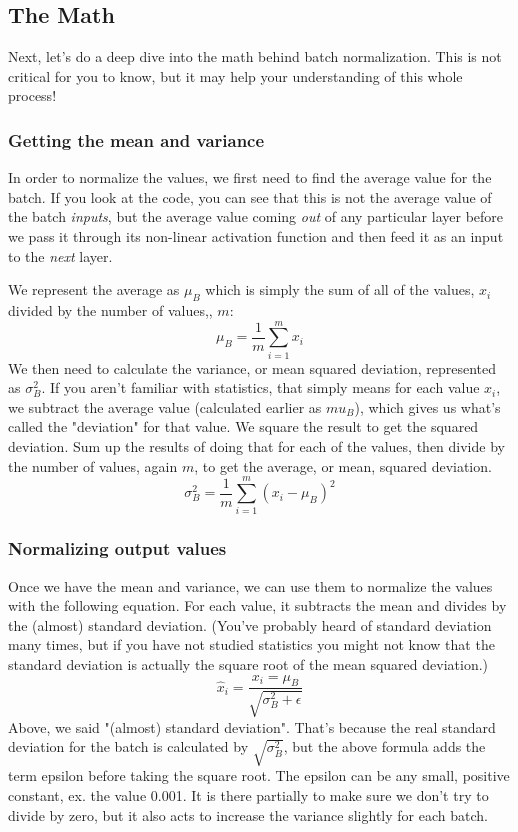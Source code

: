 \subsection{The Math}
Next, let's do a deep dive into the math behind batch normalization. This is not critical for you to know, but it may help your understanding of this whole process!

\subsubsection{Getting the mean and variance}

In order to normalize the values, we first need to find the average value for the batch. If you look at the code, you can see that this is not the average value of the batch \textit{inputs}, but the average value coming \textit{out} of any particular layer before we pass it through its non-linear activation function and then feed it as an input to the \textit{next} layer.

We represent the average as \(\mu_B\) which is simply the sum of all of the values, \(x_i\) divided by the number of values,, \(m\): \[\mu_B = \frac{1}{m} \sum_{i=1}^m x_i\]
We then need to calculate the variance, or mean squared deviation, represented as \(\sigma_B^2\). If you aren't familiar with statistics, that simply means for each value \(x_i\), we subtract the average value (calculated earlier as \(mu_B\)), which gives us what's called the "deviation" for that value. We square the result to get the squared deviation. Sum up the results of doing that for each of the values, then divide by the number of values, again \(m\), to get the average, or mean, squared deviation. \[\sigma_B^2 = \frac{1}{m} \sum_{i=1}^m (x_i - \mu_B)^2\]
\subsubsection{Normalizing output values}
Once we have the mean and variance, we can use them to normalize the values with the following equation. For each value, it subtracts the mean and divides by the (almost) standard deviation. (You've probably heard of standard deviation many times, but if you have not studied statistics you might not know that the standard deviation is actually the square root of the mean squared deviation.) \[\hat{x}_i = \frac{x_i = \mu_B}{\sqrt{\sigma_B^2 + \epsilon}}\]
Above, we said "(almost) standard deviation". That's because the real standard deviation for the batch is calculated by \(\sqrt{\sigma_B^2}\), but the above formula adds the term epsilon before taking the square root. The epsilon can be any small, positive constant, ex. the value 0.001. It is there partially to make sure we don't try to divide by zero, but it also acts to increase the variance slightly for each batch. \newline

